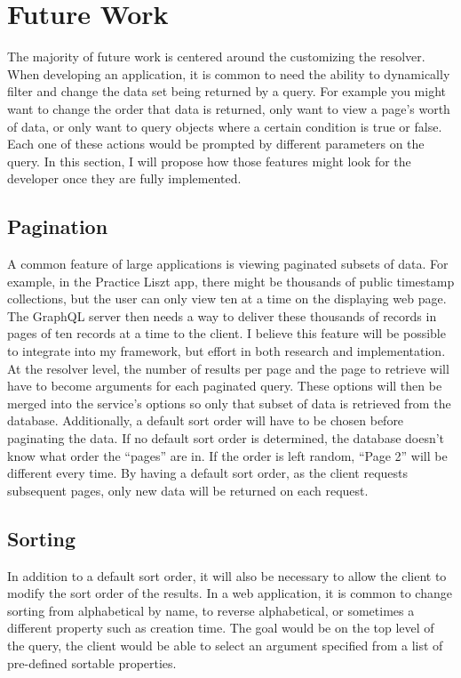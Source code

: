 \section{Future Work}

The majority of future work is centered around the customizing the resolver.  When developing an application, it is common to need the ability to dynamically filter and change the data set being returned by a query.  For example you might want to change the order that data is returned, only want to view a page's worth of data, or only want to query objects where a certain condition is true or false.  Each one of these actions would be prompted by different parameters on the query.  In this section, I will propose how those features might look for the developer once they are fully implemented.

\subsection{Pagination}

A common feature of large applications is viewing paginated subsets of data.  For example, in the Practice Liszt app, there might be thousands of public timestamp collections, but the user can only view ten at a time on the displaying web page.  The GraphQL server then needs a way to deliver these thousands of records in pages of ten records at a time to the client.  I believe this feature will be possible to integrate into my framework, but effort in both research and implementation.  At the resolver level, the number of results per page and the page to retrieve will have to become arguments for each paginated query. These options will then be merged into the service's options so only that subset of data is retrieved from the database.  Additionally, a default sort order will have to be chosen before paginating the data.  If no default sort order is determined, the database doesn't know what order the ``pages'' are in.  If the order is left random, ``Page 2'' will be different every time.  By having a default sort order, as the client requests subsequent pages, only new data will be returned on each request.

\subsection{Sorting}

In addition to a default sort order, it will also be necessary to allow the client to modify the sort order of the results.  In a web application, it is common to change sorting from alphabetical by name, to reverse alphabetical, or sometimes a different property such as creation time.  The goal would be on the top level of the query, the client would be able to select an argument specified from a list of pre-defined sortable properties.

